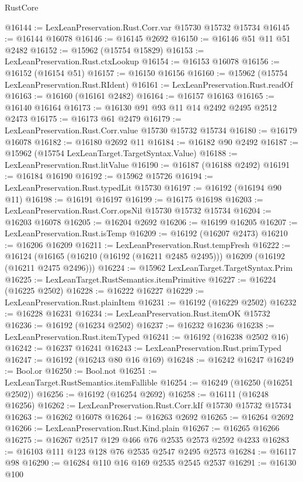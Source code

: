 \begin{lexlean}{RustCore}
\begin{coremodule}
@16144 := LexLeanPreservation.Rust.Corr.var @15730 @15732 @15734
@16145 := @16144 @16078
@16146 := @16145 @2692
@16150 := @16146 @51 @11 @51 @2482
@16152 := @15962 (@15754 @15829)
@16153 := LexLeanPreservation.Rust.ctxLookup
@16154 := @16153 @16078
@16156 := @16152 (@16154 @51)
@16157 := @16150 @16156
@16160 := @15962 (@15754 LexLeanPreservation.Rust.RIdent)
@16161 := LexLeanPreservation.Rust.readOf
@16163 := @16160 (@16161 @2482)
@16164 := @16157 @16163
@16165 := @16140 @16164
@16173 := @16130 @91 @93 @11 @14 @2492 @2495 @2512 @2473
@16175 := @16173 @61 @2479
@16179 := LexLeanPreservation.Rust.Corr.value @15730 @15732 @15734
@16180 := @16179 @16078
@16182 := @16180 @2692 @11
@16184 := @16182 @90 @2492
@16187 := @15962 (@15754 LexLeanTarget.TargetSyntax.Value)
@16188 := LexLeanPreservation.Rust.litValue
@16190 := @16187 (@16188 @2492)
@16191 := @16184 @16190
@16192 := @15962 @15726
@16194 := LexLeanPreservation.Rust.typedLit @15730
@16197 := @16192 (@16194 @90 @11)
@16198 := @16191 @16197
@16199 := @16175 @16198
@16203 := LexLeanPreservation.Rust.Corr.opsNil @15730 @15732 @15734
@16204 := @16203 @16078
@16205 := @16204 @2692
@16206 := @16199 @16205
@16207 := LexLeanPreservation.Rust.isTemp
@16209 := @16192 (@16207 @2473)
@16210 := @16206 @16209
@16211 := LexLeanPreservation.Rust.tempFresh
@16222 := @16124
    (@16165 (@16210 (@16192 (@16211 @2485 @2495))) @16209 (@16192 (@16211 @2475 @2496)))
@16224 := @15962 LexLeanTarget.TargetSyntax.Prim
@16225 := LexLeanTarget.RustSemantics.itemPrimitive
@16227 := @16224 (@16225 @2502)
@16228 := @16222 @16227
@16229 := LexLeanPreservation.Rust.plainItem
@16231 := @16192 (@16229 @2502)
@16232 := @16228 @16231
@16234 := LexLeanPreservation.Rust.itemOK @15732
@16236 := @16192 (@16234 @2502)
@16237 := @16232 @16236
@16238 := LexLeanPreservation.Rust.itemTyped
@16241 := @16192 (@16238 @2502 @16)
@16242 := @16237 @16241
@16243 := LexLeanPreservation.Rust.primTyped
@16247 := @16192 (@16243 @80 @16 @169)
@16248 := @16242 @16247
@16249 := Bool.or
@16250 := Bool.not
@16251 := LexLeanTarget.RustSemantics.itemFallible
@16254 := @16249 (@16250 (@16251 @2502))
@16256 := @16192 (@16254 @2692)
@16258 := @16111 (@16248 @16256)
@16262 := LexLeanPreservation.Rust.Corr.kIf @15730 @15732 @15734
@16263 := @16262 @16078
@16264 := @16263 @2692
@16265 := @16264 @2692
@16266 := LexLeanPreservation.Rust.Kind.plain
@16267 := @16265 @16266
@16275 := @16267 @2517 @129 @466 @76 @2535 @2573 @2592 @4233
@16283 := @16103 @111 @123 @128 @76 @2535 @2547 @2495 @2573
@16284 := @16117 @98
@16290 := @16284 @110 @16 @169 @2535 @2545 @2537
@16291 := @16130 @100

\end{coremodule}
\end{lexlean}
